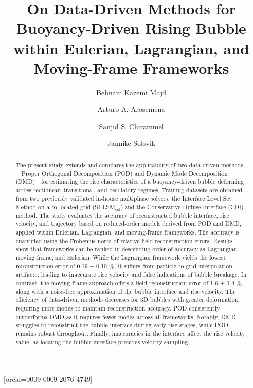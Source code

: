 \documentclass[a4paper,fleqn]{cas-sc}
\begin{document}
	

	

	

	\title[mode=title]{On Data-Driven Methods for Buoyancy-Driven Rising Bubble within Eulerian, Lagrangian, and Moving-Frame Frameworks}  
	
	

	\author[1]{Behnam Kazemi Majd}[orcid=0009-0009-2076-4749]
	\cormark[1]
	
	\author[1]{Arturo A. Arosemena}
	\author[1]{Sanjid S. Chirammel}
	\author[1]{Jannike Solsvik}
	



	
	
	
	\begin{abstract}
		The present study extends and compares the applicability of two data-driven methods—Proper Orthogonal Decomposition (POD) and Dynamic Mode Decomposition (DMD)—for estimating the rise characteristics of a buoyancy-driven bubble deforming across rectilinear, transitional, and oscillatory regimes. Training datasets are obtained from two previously validated in-house multiphase solvers: the  Interface Level Set Method on a co-located grid (SI-LSM$_{\text{col}}$) and the Conservative Diffuse Interface (CDI) method. The study evaluates the accuracy of reconstructed bubble interface, rise velocity, and trajectory based on reduced-order models derived from POD and DMD, applied within Eulerian, Lagrangian, and moving-frame frameworks. The accuracy is quantified using the Frobenius norm of relative field-reconstruction errors. Results show that frameworks can be ranked in descending order of accuracy as Lagrangian, moving frame, and Eulerian. While the Lagrangian framework yields the lowest reconstruction error of 0.19 ± 0.10 \%, it suffers from particle-to-grid interpolation artifacts, leading to inaccurate rise velocity and false indications of bubble breakage. In contrast, the moving-frame approach offers a field-reconstruction error of 1.6 ± 1.4 \%, along with a noise-free approximation of the bubble interface and rise velocity. The efficiency of data-driven methods decreases for 3D bubbles with greater deformation, requiring more modes to maintain reconstruction accuracy. POD consistently outperforms DMD as it requires fewer modes across all frameworks. Notably, DMD struggles to reconstruct the bubble interface during early rise stages, while POD remains robust throughout. Finally, inaccuracies in the interface affect the rise velocity value, as locating the bubble interface precedes velocity sampling.
		
	\end{abstract}
	
\end{document}
